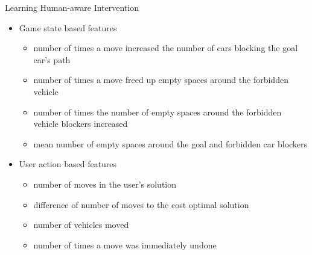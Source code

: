 \begin{frame}{Learning Human-aware Intervention}
\begin{itemize}
\item Game state based features
\begin{itemize}
\item number of times a move increased the number of cars blocking the goal car’s path
\item number of times a move freed up empty spaces around the forbidden vehicle
\item number of times the number of empty spaces around the forbidden vehicle blockers increased
\item mean number of empty spaces around the goal and forbidden car blockers
\end{itemize}
\item User action based features
\begin{itemize}
\item number of moves in the user's solution
\item difference of number of moves to the cost optimal solution
\item number of vehicles moved
\item number of times a move was immediately undone
\end{itemize}
\end{itemize}
\end{frame}